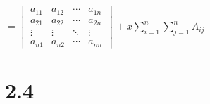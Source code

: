 		\( = \begin{vmatrix}
			a_{11} & a_{12} & \cdots & a_{1n} \\
			a_{21} & a_{22} & \cdots & a_{2n} \\
			\vdots & \vdots & \ddots & \vdots \\
			a_{n1} & a_{n2} & \cdots & a_{nn}
		\end{vmatrix} + x\sum_{i=1}^{n}\sum_{j=1}^{n}A_{ij} \)

\section{2.4}

\subsection{} %



